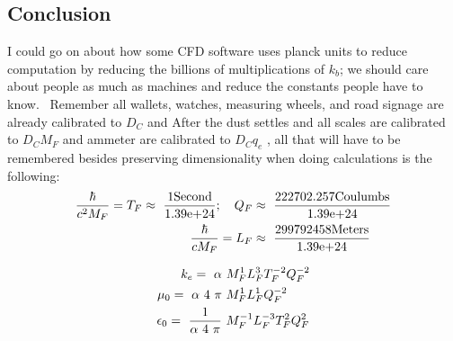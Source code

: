 \begin{multicols}{2}
\section{Conclusion}
I could go on about how some CFD software uses planck units to reduce computation by reducing the billions of multiplications of $k_b$; we should care about people as much as machines and reduce the constants people have to know.~%
Remember all wallets, watches, measuring wheels, and road signage are already calibrated to $D_C$ and After the dust settles and all scales are calibrated to $D_C M_F$ and ammeter are calibrated to $D_C q_e$ , all that will have to be remembered besides preserving dimensionality when doing calculations is the following:
\begin{align*}
{\hbar \over c^2 M_F} = T_F \approx ~{1 \text{Second}\over \text{1.39e+24}};\quad Q_F &\approx~{222702.257\text{Coulumbs}\over \text{1.39e+24}}\\
{\hbar \over c M_F} = L_F  &\approx ~{299792458 \text{Meters}\over \text{1.39e+24}}
\end{align*}
\begin{multicols}{2}[\setlength{\columnseprule}{0pt}]\noindent\begin{align*}
k_e = ~\alpha &~M_F^{1}L_F^{3}T_F^{-2}Q_F^{-2}\\
\mu _0 = ~\alpha~4~\pi &~M_F^{1}L_F^{1}Q_F^{-2}\\
\epsilon _0 = ~{1 \over \alpha~4~\pi} & ~M_F^{-1}L_F^{-3}T_F^{2}Q_F^{2}\\%

\end{align*}
\end{multicols}
\end{multicols}
